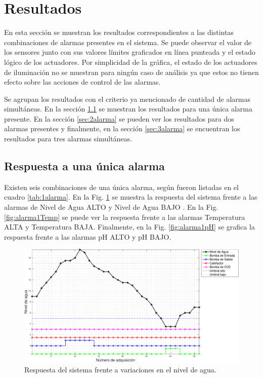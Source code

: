 \clearpage
\section{Resultados}
\label{sec:Resultados}

En esta sección se muestran los resultados correspondientes a las distintas combinaciones de alarmas presentes en el sistema.  Se puede observar el valor de los sensores junto con sus valores límites graficados en línea punteada y el estado lógico de los actuadores.  Por simplicidad de la gráfica, el estado de los actuadores de iluminación no se muestran para ningún caso de análisis ya que estos no tienen efecto sobre las acciones de control de las alarmas.

Se agrupan los resultados con el criterio ya mencionado de cantidad de alarmas simultáneas.  En la sección \ref{sec:1alarma} se muestran los resultados para una única alarma presente. En la sección \ref{sec:2alarma} se pueden ver los resultados para dos alarmas presentes y finalmente, en la sección \ref{sec:3alarma} se encuentran los resultados para tres alarmas simultáneas.

\subsection{Respuesta a una única alarma}
\label{sec:1alarma}
Existen seis combinaciones de una única alarma, según fueron listadas en el cuadro \ref{tab:1alarma}. En la Fig. \ref{fig:alarma1Nivel} se muestra la respuesta del sistema frente a las alarmas de Nivel de Agua ALTO y Nivel de Agua BAJO . En la Fig. \ref{fig:alarma1Temp} se puede ver la respuesta frente a las alarmas Temperatura ALTA y Temperatura BAJA. Finalmente, en la Fig. \ref{fig:alarma1pH} se grafica la respuesta frente a las alarmas pH ALTO y pH BAJO.

\begin{figure}[h]
\centering
    \includegraphics[width=\textwidth]{./Figures/plot1Water.pdf}
	\caption{Respuesta del sistema frente a variaciones en el nivel de agua.}
	\label{fig:alarma1Nivel}
\end{figure}

